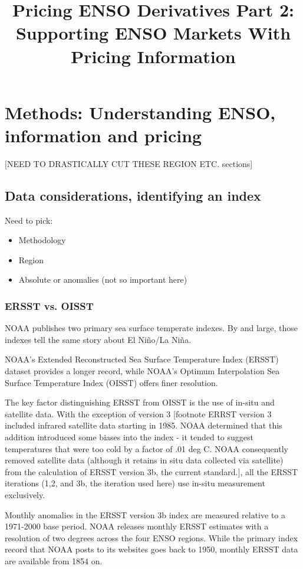 \documentclass[authoryear]{article}
\begin{document}
\title{Pricing ENSO Derivatives Part 2: Supporting ENSO Markets With Pricing Information}
\date{}  %
%


\section{Methods: Understanding ENSO, information and pricing}
[NEED TO DRASTICALLY CUT THESE REGION ETC. sections]
\subsection{Data considerations, identifying an index}
Need to pick:
\begin{itemize}
\item Methodology
\item Region
\item Absolute or anomalies (not so important here)
\end{itemize}

\subsubsection{ERSST vs. OISST}

NOAA publishes two primary sea surface temperate indexes. By and large, those indexes tell the same story about El Ni\~no/La Ni\~na.

NOAA's Extended Reconstructed Sea Surface Temperature Index (ERSST) dataset provides a longer record, while NOAA's Optimum Interpolation Sea Surface Temperature Index (OISST) offers finer resolution. 

The key factor distinguishing ERSST from OISST is the use of in-situ and satellite data. With the exception of version 3 [footnote ERRST version 3 included infrared satellite data starting in 1985. NOAA determined that this addition introduced some biases into the index - it tended to suggest temperatures that were too cold by a factor of .01 deg C. NOAA consequently removed satellite data (although it retains in situ data collected via satellite) from the calculation of ERSST version 3b, the current standard.], all the ERSST iterations (1,2, and 3b, the iteration used here) use in-situ measurement exclusively\cite{smith2004improved}\cite{smith2003extended}\cite{smith2008improvements}.

Monthly anomalies in the ERSST version 3b index are measured relative to a 1971-2000 base period\cite{xue2003interdecadal}. NOAA releases monthly ERSST estimates with a resolution of two degrees across the four ENSO regions. While the primary index record that NOAA posts to its websites goes back to 1950, monthly ERSST data are available from 1854 on.
\end{document}
